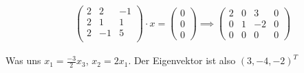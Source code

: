 \documentclass[ngerman,a4paper]{scrartcl}
\begin{document}
\begin{align*}
    &\begin{pmatrix}
    2 & 2 & -1\\
    2 & 1 & 1\\
    2 & -1 & 5\\
  \end{pmatrix} \cdot x =
  \begin{pmatrix}
    0\\0\\0
  \end{pmatrix} \implies
  \begin{pmatrix}
    2 & 0 & 3 & 0\\
    0 & 1 & -2 & 0\\
    0 & 0 & 0 & 0
  \end{pmatrix}
\end{align*}

Was uns $x_1 = \frac{-3}{2}x_3$, $x_2 = 2x_1$. Der Eigenvektor ist also $(3, -4, -2)^T$
\end{document}
